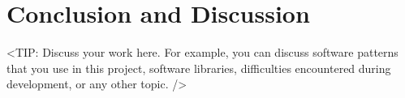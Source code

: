 \chapter{Conclusion and Discussion}
\label{chap:conclusion-discussion}

<TIP: Discuss your work here. For example, you can discuss software patterns
that you use in this project, software libraries, difficulties encountered during
development, or any other topic. />